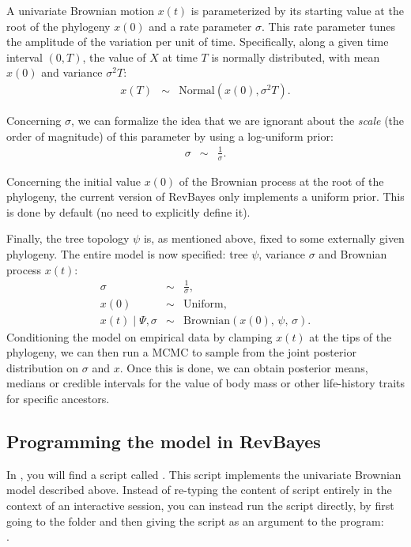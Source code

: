 A univariate Brownian motion $x(t)$ is parameterized by its starting value at the root of the phylogeny $x(0)$ and a rate parameter $\sigma$. This rate parameter tunes the amplitude of the variation per unit of time. Specifically, along a given time interval $(0,T)$, the value of $X$ at time $T$ is normally distributed, with mean $x(0)$ and variance $\sigma^2 T$:
\begin{eqnarray*}
x(T) &\sim& \text{Normal} \left( x(0), \sigma^2 T \right).
\end{eqnarray*}

Concerning $\sigma$, we can formalize the idea that we are ignorant about the \emph{scale} (the order of magnitude) of this parameter by using a log-uniform prior:
\begin{eqnarray*}
\sigma &\sim& \frac{1}{\sigma}.
\end{eqnarray*}

Concerning the initial value $x(0)$ of the Brownian process at the root of the phylogeny,
the current version of RevBayes only implements a uniform prior.
This is done by default (no need to explicitly define it).

Finally, the tree topology $\psi$ is, as mentioned above, fixed to some externally given phylogeny.
The entire model is now specified: tree $\psi$, variance $\sigma$ and Brownian process $x(t)$:
\begin{eqnarray*}
\sigma &\sim& \frac{1}{\sigma},
\\
x(0) &\sim& \text{Uniform},
\\
x(t) \mid \Psi, \sigma &\sim& \text{Brownian} \left( x(0), \, \psi, \, \sigma \right).
\end{eqnarray*}
Conditioning the model on empirical data by clamping $x(t)$ at the tips of the phylogeny, we can then run a MCMC to sample from the joint posterior distribution on $\sigma$ and $x$. Once this is done, we can obtain posterior means, medians or credible intervals for the value of body mass or other life-history traits for specific ancestors.


\subsection{Programming the model in RevBayes}

In , you will find a script called .
This script implements the univariate Brownian model described above. Instead of re-typing the content of script entirely in the context of an interactive  session, you can instead run the script directly, by first going to the  folder and then giving the script as an argument to the  program:
\\
.

